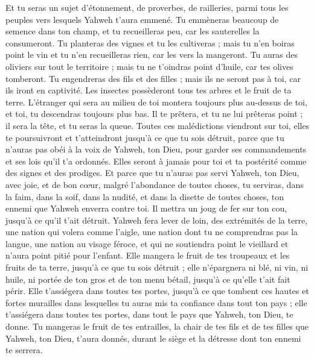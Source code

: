 \begin{multicols}{2}
Et tu seras un sujet d'étonnement, de proverbes, de railleries, parmi tous les peuples vers lesquels Yahweh t'aura emmené.
Tu emmèneras beaucoup de semence dans ton champ, et tu recueilleras peu, car les sauterelles la consumeront.
Tu planteras des vignes et tu les cultiveras ; mais tu n'en boiras point le vin et tu n'en recueilleras rien, car les vers la mangeront.
Tu auras des oliviers sur tout le territoire ; mais tu ne t'oindras point d'huile, car tes olives tomberont.
Tu engendreras des fils et des filles ; mais ils ne seront pas à toi, car ils iront en captivité.
Les insectes possèderont tous tes arbres et le fruit de ta terre.
L'étranger qui sera au milieu de toi montera toujours plus au-dessus de toi, et toi, tu descendras toujours plus bas.
Il te prêtera, et tu ne lui prêteras point ; il sera la tête, et tu seras la queue.
Toutes ces malédictions viendront sur toi, elles te poursuivront et t'atteindront jusqu'à ce que tu sois détruit, parce que tu n'auras pas obéi à la voix de Yahweh, ton Dieu, pour garder ses commandements et ses lois qu'il t'a ordonnés.
Elles seront à jamais pour toi et ta postérité comme des signes et des prodiges.
Et parce que tu n'auras pas servi Yahweh, ton Dieu, avec joie, et de bon cœur, malgré l'abondance de toutes choses,
tu serviras, dans la faim, dans la soif, dans la nudité, et dans la disette de toutes choses, ton ennemi que Yahweh enverra contre toi. Il mettra un joug de fer sur ton cou, jusqu'à ce qu'il t'ait détruit.
Yahweh fera lever de loin, des extrémités de la terre, une nation qui volera comme l'aigle, une nation dont tu ne comprendras pas la langue,
une nation au visage féroce, et qui ne soutiendra point le vieillard et n’aura point pitié pour l'enfant.
Elle mangera le fruit de tes troupeaux et les fruits de ta terre, jusqu'à ce que tu sois détruit ; elle n’épargnera ni blé, ni vin, ni huile, ni portée de ton gros et de ton menu bétail, jusqu'à ce qu'elle t'ait fait périr.
Elle t'assiégera dans toutes tes portes, jusqu'à ce que tombent ces hautes et fortes murailles dans lesquelles tu auras mis ta confiance dans tout ton pays ; elle t’assiégera dans toutes tes portes, dans tout le pays que Yahweh, ton Dieu, te donne.
Tu mangeras le fruit de tes entrailles, la chair de tes fils et de tes filles que Yahweh, ton Dieu, t'aura donnés, durant le siège et la détresse dont ton ennemi te serrera.

\end{multicols}
